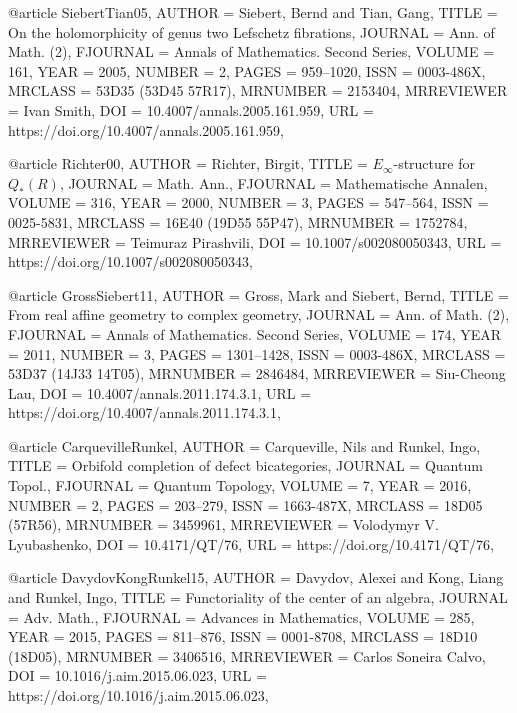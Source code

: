 @article {SiebertTian05,
    AUTHOR = {Siebert, Bernd and Tian, Gang},
     TITLE = {On the holomorphicity of genus two {L}efschetz fibrations},
   JOURNAL = {Ann. of Math. (2)},
  FJOURNAL = {Annals of Mathematics. Second Series},
    VOLUME = {161},
      YEAR = {2005},
    NUMBER = {2},
     PAGES = {959--1020},
      ISSN = {0003-486X},
   MRCLASS = {53D35 (53D45 57R17)},
  MRNUMBER = {2153404},
MRREVIEWER = {Ivan Smith},
       DOI = {10.4007/annals.2005.161.959},
       URL = {https://doi.org/10.4007/annals.2005.161.959},
}

@article {Richter00,
    AUTHOR = {Richter, Birgit},
     TITLE = {{$E_\infty$}-structure for {$Q_*(R)$}},
   JOURNAL = {Math. Ann.},
  FJOURNAL = {Mathematische Annalen},
    VOLUME = {316},
      YEAR = {2000},
    NUMBER = {3},
     PAGES = {547--564},
      ISSN = {0025-5831},
   MRCLASS = {16E40 (19D55 55P47)},
  MRNUMBER = {1752784},
MRREVIEWER = {Teimuraz Pirashvili},
       DOI = {10.1007/s002080050343},
       URL = {https://doi.org/10.1007/s002080050343},
}

@article {GrossSiebert11,
    AUTHOR = {Gross, Mark and Siebert, Bernd},
     TITLE = {From real affine geometry to complex geometry},
   JOURNAL = {Ann. of Math. (2)},
  FJOURNAL = {Annals of Mathematics. Second Series},
    VOLUME = {174},
      YEAR = {2011},
    NUMBER = {3},
     PAGES = {1301--1428},
      ISSN = {0003-486X},
   MRCLASS = {53D37 (14J33 14T05)},
  MRNUMBER = {2846484},
MRREVIEWER = {Siu-Cheong Lau},
       DOI = {10.4007/annals.2011.174.3.1},
       URL = {https://doi.org/10.4007/annals.2011.174.3.1},
}

@article {CarquevilleRunkel,
    AUTHOR = {Carqueville, Nils and Runkel, Ingo},
     TITLE = {Orbifold completion of defect bicategories},
   JOURNAL = {Quantum Topol.},
  FJOURNAL = {Quantum Topology},
    VOLUME = {7},
      YEAR = {2016},
    NUMBER = {2},
     PAGES = {203--279},
      ISSN = {1663-487X},
   MRCLASS = {18D05 (57R56)},
  MRNUMBER = {3459961},
MRREVIEWER = {Volodymyr V. Lyubashenko},
       DOI = {10.4171/QT/76},
       URL = {https://doi.org/10.4171/QT/76},
}

@article {DavydovKongRunkel15,
    AUTHOR = {Davydov, Alexei and Kong, Liang and Runkel, Ingo},
     TITLE = {Functoriality of the center of an algebra},
   JOURNAL = {Adv. Math.},
  FJOURNAL = {Advances in Mathematics},
    VOLUME = {285},
      YEAR = {2015},
     PAGES = {811--876},
      ISSN = {0001-8708},
   MRCLASS = {18D10 (18D05)},
  MRNUMBER = {3406516},
MRREVIEWER = {Carlos Soneira Calvo},
       DOI = {10.1016/j.aim.2015.06.023},
       URL = {https://doi.org/10.1016/j.aim.2015.06.023},
}

